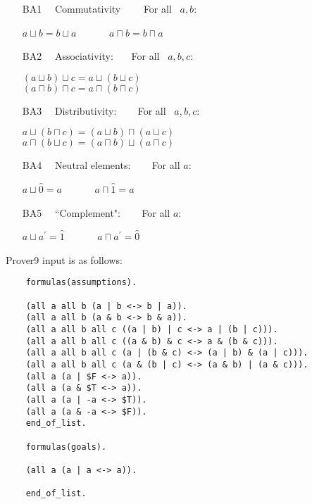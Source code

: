 \documentclass[fullpage]{article}
\begin{document}
\begin{itemize}
\item [{BA1}] ~~Commutativity~~~~ For all~  $a, b$:
\begin{center}
$a \sqcup b = b \sqcup a$~~~~~~ $a \sqcap b = b \sqcap a$
\end{center}

\item [{BA2}] ~~Associativity:~~~ For all~  $a, b, c$:
\begin{center}
$(a \sqcup b) \sqcup c = a \sqcup (b \sqcup c)$\\ $(a
\sqcap b) \sqcap c = a \sqcap (b \sqcap c)$
\end{center}
\item [{BA3}] ~~Distributivity: ~~~ For all~  $a, b, c$:
\vspace{-2mm}\begin{center}
$a \sqcup ( b \sqcap c ) = (a \sqcup b) \sqcap (a \sqcup c )$\\
$a \sqcap ( b \sqcup c ) = (a \sqcap b) \sqcup (a \sqcap
c)$
\end{center}

\item [{BA4}] \ \ Neutral elements: ~~~ For all $a$: \vspace{-2mm}
\begin{center}
$a \sqcup \hat{0} = a$~~~~~~ $a \sqcap \hat{1} = a$
\end{center}

\item [{BA5}] ~~``Complement": ~~~ For all $a$: \vspace{-2mm}
\begin{center}
$a \sqcup  a^\prime = \hat{1}$~~~~~~ $a \sqcap  a^\prime =
\hat{0}$
\end{center}
\end{itemize}
\newpage
Prover9 input is as follows:
 {\footnotesize \begin{verbatim}
	formulas(assumptions).
	
	(all a all b (a | b <-> b | a)).
	(all a all b (a & b <-> b & a)).
	(all a all b all c ((a | b) | c <-> a | (b | c))).
	(all a all b all c ((a & b) & c <-> a & (b & c))).
	(all a all b all c (a | (b & c) <-> (a | b) & (a | c))).
	(all a all b all c (a & (b | c) <-> (a & b) | (a & c))).
	(all a (a | $F <-> a)).
	(all a (a & $T <-> a)).
	(all a (a | -a <-> $T)).
	(all a (a & -a <-> $F)).
	end_of_list.
	
	formulas(goals).
	
	(all a (a | a <-> a)).
	
	end_of_list.
\end{verbatim} }
\end{document}
